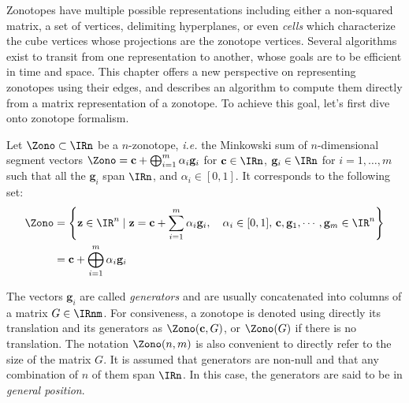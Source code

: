 Zonotopes have multiple possible representations including either a non-squared matrix, a set of vertices, delimiting hyperplanes, or even \emph{cells} which characterize the cube vertices whose projections are the zonotope vertices. Several algorithms exist to transit from one representation to another, whose goals are to be efficient in time and space. This chapter offers a new perspective on representing zonotopes using their edges, and describes an algorithm to compute them directly from a matrix representation of a zonotope. To achieve this goal, let's first dive onto zonotope formalism.

Let $\Zono \subset \IRn$ be a $n$-zonotope, \emph{i.e.} 
the Minkowski sum of $n$-dimensional segment vectors $\Zono = \mathbf{c} + \bigoplus_{i=1}^m \alpha_i \mathbf{g}_i$ for $\mathbf{c} \in \IRn$, $\mathbf{g}_i \in \IRn$ for $i=1,\dots,m$ such that all the $\mathbf{g}_i$ span $\IRn$, and $\alpha_i\in[0,1]$. It corresponds to the following set:
\begin{align*}
    \Zono &= \left\{ \mathbf{z} \in \IR^n \mid \mathbf{z} = \mathbf{c} + \sum_{i=1}^m \alpha_i \mathbf{g}_i,\quad \alpha_i \in [0,1],\, \mathbf{c}, \mathbf{g}_1,\cdots,\mathbf{g}_m\in\IR^n \right\} \\
    &= \mathbf{c} + \bigoplus_{i=1}^m \alpha_i \mathbf{g}_i
\end{align*}

The vectors $\mathbf{g}_i$ are called \emph{generators} and are usually concatenated into columns of a matrix $G\in\IRnm$. For consiveness, a zonotope is denoted using directly its translation and its generators as $\Zono(\mathbf{c}, G)$, or $\Zono(G)$ if there is no translation. The notation $\Zono(n, m)$ is also convenient to directly refer to the size of the matrix $G$. It is assumed that generators are non-null and that any combination of $n$ of them span $\IRn$. In this case, the generators are said to be in \emph{general position}.

